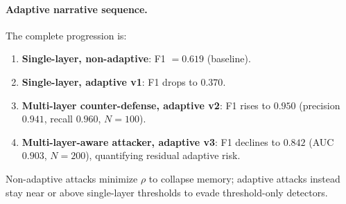 \documentclass[10pt,twocolumn]{article}
\begin{document}
\paragraph{Adaptive narrative sequence.}
The complete progression is:
\begin{enumerate}
\item \textbf{Single-layer, non-adaptive}: F1 $=0.619$ (baseline).
\item \textbf{Single-layer, adaptive v1}: F1 drops to $0.370$.
\item \textbf{Multi-layer counter-defense, adaptive v2}: F1 rises to $0.950$ (precision $0.941$, recall $0.960$, $N=100$).
\item \textbf{Multi-layer-aware attacker, adaptive v3}: F1 declines to $0.842$ (AUC $0.903$, $N=200$), quantifying residual adaptive risk.
\end{enumerate}

\begin{table}[t]
\centering
\caption{Mean spectral radius by attack regime (narrative disambiguation).}
\label{tab:rho_regimes}
\small
{}
\vspace{2pt}
\begin{minipage}{\columnwidth}
{\footnotesize Non-adaptive attacks minimize $\rho$ to collapse memory; adaptive attacks instead stay near or above single-layer thresholds to evade threshold-only detectors.}
\end{minipage}
\end{table}
\end{document}
